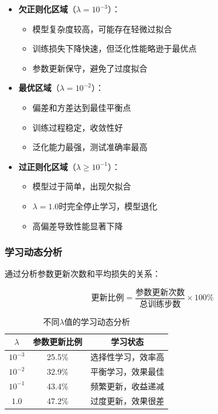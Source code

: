 \documentclass[a4paper]{article}
\begin{document}
\begin{itemize}
    \item \textbf{欠正则化区域}（$\lambda = 10^{-3}$）：
    \begin{itemize}
        \item 模型复杂度较高，可能存在轻微过拟合
        \item 训练损失下降快速，但泛化性能略逊于最优点
        \item 参数更新保守，避免了过度拟合
    \end{itemize}
    
    \item \textbf{最优区域}（$\lambda = 10^{-2}$）：
    \begin{itemize}
        \item 偏差和方差达到最佳平衡点
        \item 训练过程稳定，收敛性好
        \item 泛化能力最强，测试准确率最高
    \end{itemize}
    
    \item \textbf{过正则化区域}（$\lambda \geq 10^{-1}$）：
    \begin{itemize}
        \item 模型过于简单，出现欠拟合
        \item $\lambda = 1.0$时完全停止学习，模型退化
        \item 高偏差导致性能显著下降
    \end{itemize}
\end{itemize}

\subsubsection{学习动态分析}

通过分析参数更新次数和平均损失的关系：

\begin{equation}
\text{更新比例} = \frac{\text{参数更新次数}}{\text{总训练步数}} \times 100\%
\end{equation}

\begin{table}[H]
\centering
\caption{不同$\lambda$值的学习动态分析}
\begin{tabular}{ccc}
\toprule
$\lambda$ & 参数更新比例 & 学习状态 \\
\midrule
$10^{-3}$ & 25.5\% & 选择性学习，效率高 \\
$10^{-2}$ & 32.9\% & 平衡学习，效果最佳 \\
$10^{-1}$ & 43.4\% & 频繁更新，收益递减 \\
$1.0$ & 47.2\% & 过度更新，效果很差 \\
\bottomrule
\end{tabular}
\end{table}
\end{document}
